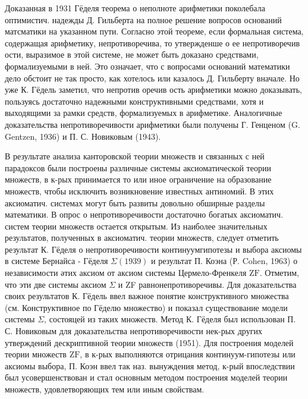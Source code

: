 \documentclass[10pt]{article}
\begin{document}
Доказанная в 1931 Гёделя теорема о неполноте арифметики поколебала оптимистич. надежды Д. Гильберта на полное решение вопросов оснований матсматики на указанном пути. Согласно этой теореме, если формальная система, содержащая арифметику, непротиворечива, то утвержденше о ее непротиворечив ости, выразимое в этой системе, не может быть доказано средствами, формализуемыми в ней. Это означает, что с вопросами оснований математики дело обстоит не так просто, как хотелось или казалось Д. Гильберту вначале. Но уже К. Гёдель заметил, что непротив оречив ость арифметики можно доказывать, пользуясь достаточно надежными конструктивными средствами, хотя и выходящими за рамки средств, формализуемых в арифметике. Аналогичные доказательства непротиворечивости арифметики были получены Г. Генценом (G. Gentzen, 1936) и П. С. Новиковым (1943).



В результате анализа канторовской теории множеств и связанных с ней парадоксов были построены различные системы аксиоматической теории множеств, в к-рых принимается то или иное ограничение на образование множеств, чтобы исключить возникновение известных антиномий. В этих аксиоматич. системах могут быть развиты довольно обширные разделы математики. В опрос о непротиворечивости достаточно богатых аксиоматич. систем теории множеств остается открытым. Из наиболее значительных результатов, полученных в аксиоматич. теории множеств, следует отметить результат К. Гёделя о непротиворечивости континуумгипотезы и выбора аксиомы в системе Бернайса - Гёделя $\Sigma(1939)$ и результат П. Коэна (Р. Cohen, 1963) о независимости әтих аксиом от аксиом системы Цермело-Френкеля $\mathrm{ZF}$. Отметим, что эти две системы аксиом $\Sigma$ и ZF равнонепротиворечивы. Для доказательства своих результатов К. Гёдель ввел важное понятие конструктивного множества (см. Конструктивное по Гёделю множество) и показал существование модели системы $\Sigma$, состояцей из таких множеств. Метод К. Гёделя был использован П. С. Новиковым для доказательства непротиворечивости нек-рых других утверждений дескриптивной теории множеств (1951). Для построения моделей теории множеств $\mathrm{ZF}$, в к-рых выполняются отрицания континуум-гипотезы или аксиомы выбора, П. Коэн ввел так наз. вынуждения метод, к-рый впоследствии был усовершенствован и стал основным методом построения моделей теории множеств, удовлетворяющих тем или иным свойствам.
\end{document}
